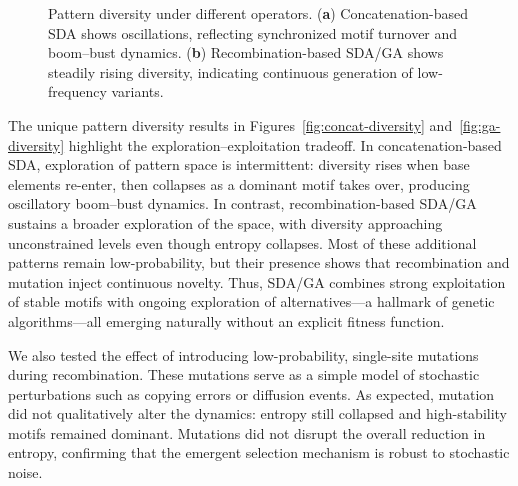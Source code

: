 \documentclass[life,article,submit,pdftex,moreauthors]{Definitions/mdpi}
\begin{document}
\begin{figure}[H]
\centering
{}
\hfill
{}
\caption{Pattern diversity under different operators. (\textbf{a}) Concatenation-based SDA shows oscillations, reflecting synchronized motif turnover and boom--bust dynamics. (\textbf{b}) Recombination-based SDA/GA shows steadily rising diversity, indicating continuous generation of low-frequency variants.}
\label{fig:diversity-comparison}
\end{figure}


The unique pattern diversity results in Figures~\ref{fig:concat-diversity} and~\ref{fig:ga-diversity} highlight the exploration--exploitation tradeoff. 
In concatenation-based SDA, exploration of pattern space is intermittent: 
diversity rises when base elements re-enter, then collapses as a dominant 
motif takes over, producing oscillatory boom--bust dynamics. In contrast, 
recombination-based SDA/GA sustains a broader exploration of the space, 
with diversity approaching unconstrained levels even though entropy 
collapses. Most of these additional patterns remain low-probability, but 
their presence shows that recombination and mutation inject continuous 
novelty. Thus, SDA/GA combines strong exploitation of stable motifs with 
ongoing exploration of alternatives---a hallmark of genetic algorithms---all 
emerging naturally without an explicit fitness function.


We also tested the effect of introducing low-probability, single-site mutations during recombination. 
These mutations serve as a simple model of stochastic perturbations such as copying errors or 
diffusion events. As expected, mutation did not qualitatively alter the dynamics: entropy still 
collapsed and high-stability motifs remained dominant. Mutations did not disrupt the overall reduction in entropy, confirming that the  emergent selection mechanism is robust to stochastic noise.
\end{document}
